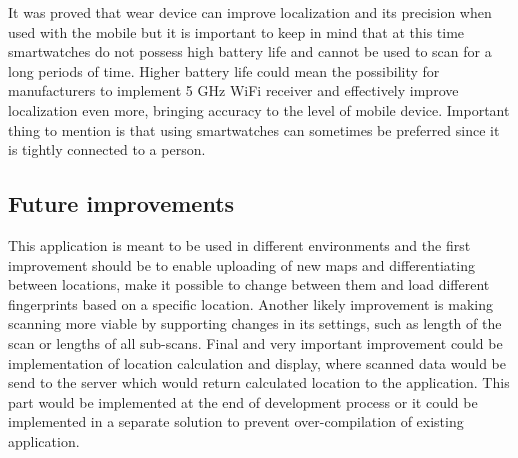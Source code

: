 It was proved that wear device can improve localization and its precision when used with the mobile but it is important to keep in mind that at this time smartwatches do not possess high battery life and cannot be used to scan for a long periods of time. Higher battery life could mean the possibility for manufacturers to implement 5 GHz WiFi receiver and effectively improve localization even more, bringing accuracy to the level of mobile device. Important thing to mention is that using smartwatches can sometimes be preferred since it is tightly connected to a person.

\subsection{Future improvements}\label{sec:FutureImprovements}
This application is meant to be used in different environments and the first improvement should be to enable uploading of new maps and differentiating between locations, make it possible to change between them and load different fingerprints based on a specific location. Another likely improvement is making scanning more viable by supporting changes in its settings, such as length of the scan or lengths of all sub-scans. Final and very important improvement could be implementation of location calculation and display, where scanned data would be send to the server which would return calculated location to the application. This part would be implemented at the end of development process or it could be implemented in a separate solution to prevent over-compilation of existing application.